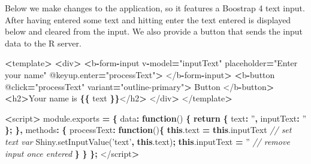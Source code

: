 \documentclass[10pt,]{krantz}
\makeatletter
\newenvironment{Shaded}{\begin{snugshade}}{\end{snugshade}}
\newcommand{\AttributeTok}[1]{\textcolor[rgb]{0.61,0.61,0.61}{#1}}
\newcommand{\CommentTok}[1]{\textcolor[rgb]{0.37,0.37,0.37}{\textit{#1}}}
\newcommand{\ControlFlowTok}[1]{\textcolor[rgb]{0.27,0.27,0.27}{\textbf{#1}}}
\newcommand{\DataTypeTok}[1]{\textcolor[rgb]{0.27,0.27,0.27}{#1}}
\newcommand{\KeywordTok}[1]{\textcolor[rgb]{0.27,0.27,0.27}{\textbf{#1}}}
\newcommand{\NormalTok}[1]{#1}
\newcommand{\OperatorTok}[1]{\textcolor[rgb]{0.43,0.43,0.43}{\textbf{#1}}}
\newcommand{\StringTok}[1]{\textcolor[rgb]{0.5,0.5,0.5}{#1}}
\newcommand{\VariableTok}[1]{\textcolor[rgb]{0,0,0}{#1}}
\newenvironment{kframe}{%
\medskip{}
\setlength{\fboxsep}{.8em}
 \def\at@end@of@kframe{}%
 \ifinner\ifhmode%
  \def\at@end@of@kframe{\end{minipage}}%
  \begin{minipage}{\columnwidth}%
 \fi\fi%
 \def\FrameCommand##1{\hskip\@totalleftmargin \hskip-\fboxsep
 \colorbox{shadecolor}{##1}\hskip-\fboxsep
     \hskip-\linewidth \hskip-\@totalleftmargin \hskip\columnwidth}%
 \MakeFramed {\advance\hsize-\width
   \@totalleftmargin\z@ \linewidth\hsize
   \@setminipage}}%
 {\par\unskip\endMakeFramed%
 \at@end@of@kframe}
\renewenvironment{Shaded}{\begin{kframe}}{\end{kframe}}
\makeatother
\begin{document}
Below we make changes to the application, so it features a Boostrap 4 text input. After having entered some text and hitting enter the text entered is displayed below and cleared from the input. We also provide a button that sends the input data to the R server.

\begin{Shaded}
\begin{Highlighting}[]
\OperatorTok{<}\NormalTok{template}\OperatorTok{>}
  \OperatorTok{<}\NormalTok{div}\OperatorTok{>}
    \OperatorTok{<}\NormalTok{b}\OperatorTok{-}\NormalTok{form}\OperatorTok{-}\NormalTok{input }
\NormalTok{      v}\OperatorTok{-}\NormalTok{model}\OperatorTok{=}\StringTok{"inputText"} 
\NormalTok{      placeholder}\OperatorTok{=}\StringTok{"Enter your name"} 
\NormalTok{      @}\VariableTok{keyup}\NormalTok{.}\AttributeTok{enter}\OperatorTok{=}\StringTok{"processText"}\OperatorTok{>}
\NormalTok{    </b}\OperatorTok{-}\NormalTok{form}\OperatorTok{-}\NormalTok{input}\OperatorTok{>}
    \OperatorTok{<}\NormalTok{b}\OperatorTok{-}\NormalTok{button }
\NormalTok{      @click}\OperatorTok{=}\StringTok{"processText"} 
\NormalTok{      variant}\OperatorTok{=}\StringTok{"outline-primary"}\OperatorTok{>}
\NormalTok{      Button}
\NormalTok{    </b}\OperatorTok{-}\NormalTok{button}\OperatorTok{>}
    \OperatorTok{<}\NormalTok{h2}\OperatorTok{>}\NormalTok{Your name is }\OperatorTok{\{\{}\NormalTok{ text }\OperatorTok{\}\}}\NormalTok{</h2}\OperatorTok{>}
\NormalTok{  </div}\OperatorTok{>}
\NormalTok{</template}\OperatorTok{>}

\OperatorTok{<}\NormalTok{script}\OperatorTok{>}
\VariableTok{module}\NormalTok{.}\AttributeTok{exports} \OperatorTok{=} \OperatorTok{\{}
  \DataTypeTok{data}\OperatorTok{:} \KeywordTok{function}\NormalTok{() }\OperatorTok{\{}
    \ControlFlowTok{return} \OperatorTok{\{}
      \DataTypeTok{text}\OperatorTok{:} \StringTok{''}\OperatorTok{,}
      \DataTypeTok{inputText}\OperatorTok{:} \StringTok{''}
    \OperatorTok{\};}
  \OperatorTok{\},}
  \DataTypeTok{methods}\OperatorTok{:} \OperatorTok{\{}
    \DataTypeTok{processText}\OperatorTok{:} \KeywordTok{function}\NormalTok{()}\OperatorTok{\{}
      \KeywordTok{this}\NormalTok{.}\AttributeTok{text} \OperatorTok{=} \KeywordTok{this}\NormalTok{.}\AttributeTok{inputText} \CommentTok{// set text var}
      \VariableTok{Shiny}\NormalTok{.}\AttributeTok{setInputValue}\NormalTok{(}\StringTok{'text'}\OperatorTok{,} \KeywordTok{this}\NormalTok{.}\AttributeTok{text}\NormalTok{)}\OperatorTok{;}
      \KeywordTok{this}\NormalTok{.}\AttributeTok{inputText} \OperatorTok{=} \StringTok{''} \CommentTok{// remove input once entered}
    \OperatorTok{\}}
  \OperatorTok{\}}
\OperatorTok{\};}
\NormalTok{</script}\OperatorTok{>}
\end{Highlighting}
\end{Shaded}
\end{document}
